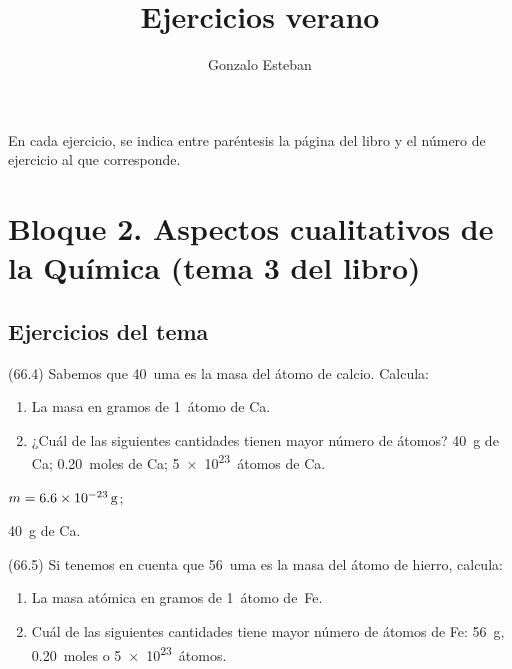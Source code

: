 \documentclass[10pt,a5paper,twoside]{article}
\title{Ejercicios verano}
\author{Gonzalo Esteban}
\begin{document}
\maketitle

En cada ejercicio, se indica entre paréntesis la página del libro y el número de ejercicio al que corresponde.

\section{Bloque 2. Aspectos cualitativos de la Química (tema 3 del libro)}

  \subsection*{Ejercicios del tema}

    \begin{exercise}[
        tags    = {},
        topics  = {química,química básica},
        source  = {FQ 1B MGH 2016, p66, e4},
      ]
      (66.4) Sabemos que \SI{40}{uma} es la masa del átomo de calcio. Calcula:
      \begin{enumerate}
        \item La masa en gramos de \SI{1}{átomo} de Ca.
        \item ¿Cuál de las siguientes cantidades tienen mayor número de átomos? \SI{40}{g} de Ca; \SI{0,20}{moles} de Ca; \SI{5e23}{átomos} de Ca.
      \end{enumerate}
    \end{exercise}

    \begin{solution}
      \begin{enumerate*}
        \item \( m = \SI{6,6E-23}{\gram} \);
        \item \SI{40}{\gram} de Ca.
      \end{enumerate*}
    \end{solution}




    \begin{exercise}[
        tags    = {},
        topics  = {química,química básica},
        source  = {FQ 1B MGH 2016, p66, e5},
      ]
      (66.5) Si tenemos en cuenta que \SI{56}{uma} es la masa del átomo de hierro, calcula:
      \begin{enumerate}
        \item La masa atómica en gramos de \SI{1}{átomo} de~Fe.
        \item Cuál de las siguientes cantidades tiene mayor número de átomos de Fe: \SI{56}{\gram}, \SI{0,20}{moles} o \SI{5e23}{átomos}.
      \end{enumerate}
    \end{exercise}
\end{document}
